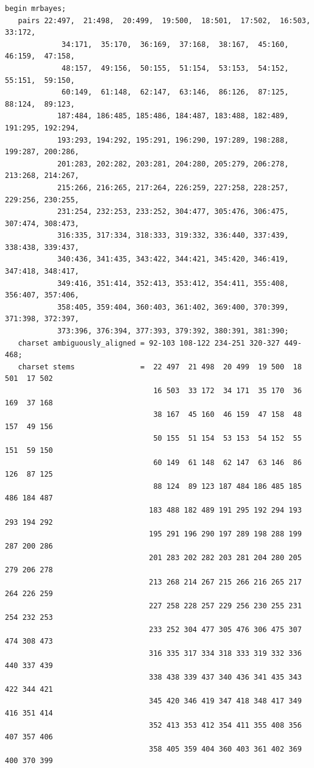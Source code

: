 \documentclass{svmult}
\begin{document}
\begin{verbatim}
begin mrbayes;
   pairs 22:497,  21:498,  20:499,  19:500,  18:501,  17:502,  16:503,  33:172, 
	         34:171,  35:170,  36:169,  37:168,  38:167,  45:160,  46:159,  47:158, 
	         48:157,  49:156,  50:155,  51:154,  53:153,  54:152,  55:151,  59:150, 
	         60:149,  61:148,  62:147,  63:146,  86:126,  87:125,  88:124,  89:123, 
	        187:484, 186:485, 185:486, 184:487, 183:488, 182:489, 191:295, 192:294, 
	        193:293, 194:292, 195:291, 196:290, 197:289, 198:288, 199:287, 200:286, 
	        201:283, 202:282, 203:281, 204:280, 205:279, 206:278, 213:268, 214:267, 
	        215:266, 216:265, 217:264, 226:259, 227:258, 228:257, 229:256, 230:255, 
	        231:254, 232:253, 233:252, 304:477, 305:476, 306:475, 307:474, 308:473, 
	        316:335, 317:334, 318:333, 319:332, 336:440, 337:439, 338:438, 339:437, 
	        340:436, 341:435, 343:422, 344:421, 345:420, 346:419, 347:418, 348:417, 
	        349:416, 351:414, 352:413, 353:412, 354:411, 355:408, 356:407, 357:406, 
	        358:405, 359:404, 360:403, 361:402, 369:400, 370:399, 371:398, 372:397, 
	        373:396, 376:394, 377:393, 379:392, 380:391, 381:390;
   charset ambiguously_aligned = 92-103 108-122 234-251 320-327 449-468;
   charset stems               =  22 497  21 498  20 499  19 500  18 501  17 502 
                                  16 503  33 172  34 171  35 170  36 169  37 168 
                                  38 167  45 160  46 159  47 158  48 157  49 156 
                                  50 155  51 154  53 153  54 152  55 151  59 150  
                                  60 149  61 148  62 147  63 146  86 126  87 125  
                                  88 124  89 123 187 484 186 485 185 486 184 487 
                                 183 488 182 489 191 295 192 294 193 293 194 292 
                                 195 291 196 290 197 289 198 288 199 287 200 286 
                                 201 283 202 282 203 281 204 280 205 279 206 278 
                                 213 268 214 267 215 266 216 265 217 264 226 259 
                                 227 258 228 257 229 256 230 255 231 254 232 253 
                                 233 252 304 477 305 476 306 475 307 474 308 473 
                                 316 335 317 334 318 333 319 332 336 440 337 439 
                                 338 438 339 437 340 436 341 435 343 422 344 421 
                                 345 420 346 419 347 418 348 417 349 416 351 414 
                                 352 413 353 412 354 411 355 408 356 407 357 406 
                                 358 405 359 404 360 403 361 402 369 400 370 399 

\end{verbatim}
\end{document}
